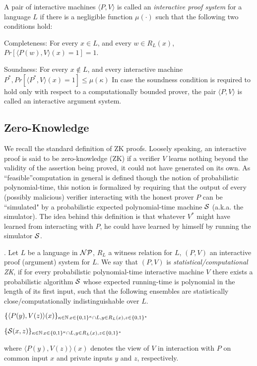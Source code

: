 { A pair of interactive machines $\langle P, V \rangle$ is called an \emph{interactive proof system} for a language $L$ if there is a negligible function $\mu(\cdot)$ such that the following two conditions hold:
\BI
\item Completeness: For every $x \in L$, and every $w\in R_L(x)$, $Pr [\langle P(w), V \rangle(x)= 1] = 1$. 
\item  Soundness: For every $x \notin L$, and every interactive machine $P^*, Pr [\langle P^*, V \rangle(x) = 1] \leq\mu(\kappa)$
\EI
In case the soundness condition is required to hold only with respect to a computationally
bounded prover, the pair $\langle P, V \rangle$ is called an interactive argument system.
\ED

\subsection{Zero-Knowledge}
We recall the standard definition of ZK proofs. Loosely speaking, an interactive proof is said to be
zero-knowledge (ZK) if a verifier $V$ learns nothing beyond the validity of the assertion being proved,
it could not have generated on its own. As ``feasible''computation in general is defined though
the notion of probabilistic polynomial-time, this notion is formalized by requiring that the output
of every (possibly malicious) verifier interacting with the honest prover $P$ can be ``simulated" by
a probabilistic expected polynomial-time machine ${\cal S}$ (a.k.a. the simulator). The idea behind this
definition is that whatever $V^*$ might have learned from interacting with $P$, he could have learned
by himself by running the simulator ${\cal S}$. 

\BD [ZK]. Let $L$ be a language in ${{\cal NP}}$, $R_L$ a witness relation for $L$, $(P,V )$ an interactive
proof (argument) system for $L$. We say that $(P, V )$ is \emph{statistical/computational ZK}, if for every
probabilistic polynomial-time interactive machine $V$ there exists a probabilistic algorithm ${\cal S}$ whose
expected running-time is polynomial in the length of its first input, such that the following ensembles
are statistically close/computationally indistinguishable over $L$.
\BI
\item $\{\langle P(y), V(z) \rangle(x)\}_{\kappa\in \mathbb{N}\,x\in \{0,1\}^\kappa\cap L, y \in R_L(x), z\in\{0,1\}^*}$
\item $\{{\cal S} (x,z)\}_{\kappa\in \mathbb{N}\,x\in \{0,1\}^\kappa\cap L, y \in R_L(x), z\in\{0,1\}^*}$
\EI

where $\langle P(y), V(z) \rangle(x)$ denotes the view of $V$ in interaction with $P$ on common input $x$ and private
inputs $y$ and $z$, respectively.

}
